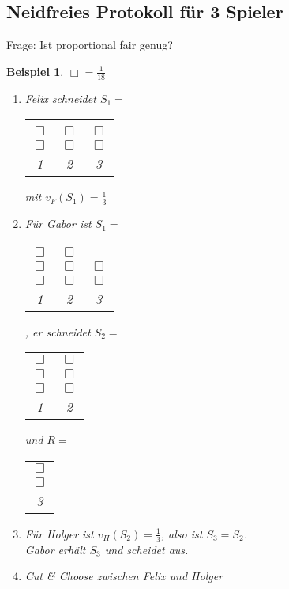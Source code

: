\documentclass[a4paper,10pt]{scrartcl}
\newtheorem*{beispiel*}{Beispiel}
\begin{document}
\subsection{Neidfreies Protokoll für 3 Spieler}
Frage: Ist proportional fair genug?

\begin{beispiel*}
 $\Box=\frac{1}{18}$
 \begin{enumerate}
  \item Felix schneidet $S_1=$\begin{tabular}{ccc}
                               &&\\
                               $\Box$&$\Box$&$\Box$\\
                               $\Box$&$\Box$&$\Box$\\
                               1&2&3
                              \end{tabular}
        mit $v_F(S_1)=\frac{1}{3}$
  \item Für Gabor ist $S_1=$\begin{tabular}{ccc}
                               $\Box$&$\Box$& \\
                               $\Box$&$\Box$&$\Box$\\
                               $\Box$&$\Box$&$\Box$\\
                               1&2&3
                              \end{tabular}, er schneidet $S_2=$\begin{tabular}{cc}
                               $\Box$&$\Box$\\
                               $\Box$&$\Box$\\
                               $\Box$&$\Box$\\
                               1&2
                              \end{tabular} und $R=$\begin{tabular}{c}
                               \\
                               $\Box$\\
                               $\Box$\\
                               3
                              \end{tabular}
  \item Für Holger ist $v_H(S_2)=\frac{1}{3}$, also ist $S_3=S_2$.\\
   Gabor erhält $S_3$ und scheidet aus.
  \item Cut \& Choose zwischen Felix und Holger\\

\end{enumerate}
\end{beispiel*}
\end{document}
